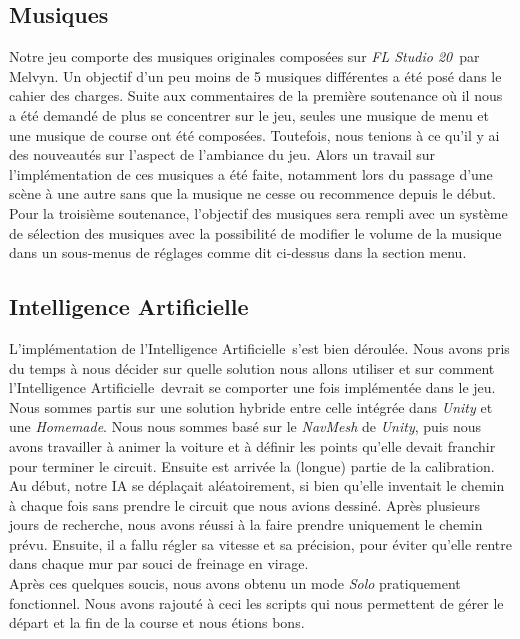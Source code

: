 \documentclass[12pt,a4paper]{article}
\newcommand{\AI}{Intelligence Artificielle}
\newcommand{\FL}{\textsl{FL Studio 20}}
\begin{document}
        \subsection{Musiques}
            Notre jeu comporte des musiques originales composées sur \FL\, par Melvyn. Un objectif d'un 
            peu moins de 5 musiques différentes a été posé dans le cahier des charges. Suite aux 
            commentaires de la première soutenance où il nous a été demandé de plus se concentrer sur le
            jeu, seules une musique de menu et une musique de course ont été composées. Toutefois, nous 
            tenions à ce qu'il y ai des nouveautés sur l'aspect de l'ambiance du jeu. Alors un travail 
            sur l'implémentation de ces musiques a été faite, notamment lors du passage d'une scène à
            une autre sans que la musique ne cesse ou recommence depuis le début. Pour la troisième 
            soutenance, l'objectif des musiques sera rempli avec un système de sélection des musiques 
            avec la possibilité de modifier le volume de la musique dans un sous-menus de réglages comme
            dit ci-dessus dans la section menu.

        \subsection{\AI}
            L'implémentation de l'\AI\, s'est bien déroulée. Nous avons pris du temps
            à nous décider sur quelle solution nous allons utiliser et sur comment
            l'\AI\, devrait se comporter une fois implémentée dans le jeu. Nous sommes partis sur une
            solution hybride entre celle intégrée dans \textsl{Unity} et une \textsl{Homemade}.
            Nous nous sommes basé sur le \textsl{NavMesh} de \textsl{Unity}, puis nous avons
            travailler à animer la voiture et à définir les points qu'elle devait franchir pour
            terminer le circuit.  Ensuite est arrivée
            la (longue) partie de la calibration. Au début, notre IA se déplaçait aléatoirement,
            si bien qu'elle inventait le chemin à chaque fois sans prendre le circuit que nous
            avions dessiné. Après plusieurs jours de recherche, nous avons réussi à la faire
            prendre uniquement le chemin prévu. Ensuite, il a fallu régler sa vitesse et sa
            précision, pour éviter qu'elle rentre dans chaque mur par souci de freinage en virage.\\
            Après ces quelques soucis, nous avons obtenu un mode \textsl{Solo} pratiquement
            fonctionnel. Nous avons rajouté à ceci les scripts qui nous permettent de gérer
            le départ et la fin de la course et nous étions bons.
\end{document}
